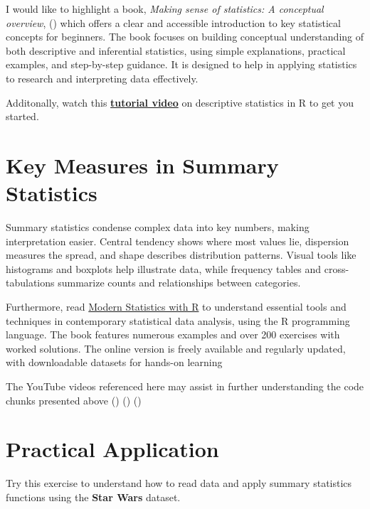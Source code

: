 \documentclass[
  man,
  floatsintext,
  longtable,
  nolmodern,
  notxfonts,
  notimes,
  colorlinks=true,linkcolor=blue,citecolor=blue,urlcolor=blue]{apa7}
\begin{document}
I would like to highlight a book, \emph{Making sense of statistics: A
conceptual overview}, ()
which offers a clear and accessible introduction to key statistical
concepts for beginners. The book focuses on building conceptual
understanding of both descriptive and inferential statistics, using
simple explanations, practical examples, and step-by-step guidance. It
is designed to help in applying statistics to research and interpreting
data effectively.

Additonally, watch this
\href{https://www.youtube.com/watch?v=yoPGwvUzjgQ}{\textbf{tutorial
video}} on descriptive statistics in R to get you started.

\section{Key Measures in Summary
Statistics}\label{key-measures-in-summary-statistics}

Summary statistics condense complex data into key numbers, making
interpretation easier. Central tendency shows where most values lie,
dispersion measures the spread, and shape describes distribution
patterns. Visual tools like histograms and boxplots help illustrate
data, while frequency tables and cross-tabulations summarize counts and
relationships between categories.

Furthermore, read
\href{https://modernstatisticswithr.com/index.html}{Modern Statistics
with R} to understand essential tools and techniques in contemporary
statistical data analysis, using the R programming language. The book
features numerous examples and over 200 exercises with worked solutions.
The online version is freely available and regularly updated, with
downloadable datasets for hands-on learning

The YouTube videos referenced here may assist in further understanding
the code chunks presented above
()
()
()

\section{Practical Application}\label{practical-application}

Try this exercise to understand how to read data and apply summary
statistics functions using the \textbf{Star Wars} dataset.
\end{document}
